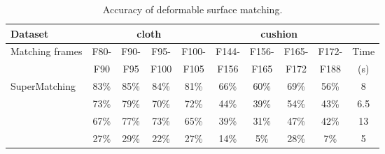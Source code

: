 \begin{table}[tb]
\centering
\tabcolsep=1pt
\setlength{\aboverulesep}{0pt}
\setlength{\belowrulesep}{0pt}
\caption{Accuracy of deformable surface matching.}
\hspace{-5ex}
\label{tab:errorrate1}
\small
\begin{tabular}{l|c c c c | c c c c | c}
\toprule
{Dataset}  & \multicolumn{4}{|c|}{ {cloth}} & \multicolumn{4}{c|}{ {cushion}} & \\
\hline
 {Matching frames} &  {F80-}	&  {F90-}	& {F95-}	& {F100-} & {F144-} & {F156-}	& {F165-}	& {F172-} &  {Time}  \\
 {}                &  {F90 }    &  {F95 }   & {F100}    & {F105}  & {F156}  & {F165}    & {F172}    & {F188}  &  {(s)} \\
\hline
 {SuperMatching}   &  {83\%}    &  {85\%}	& {84\%} 	& {81\%}  & {66\%}	& {60\%}	& {69\%}	& {56\%}  &  {8}  \\
 {\cite{Zass08}}   & {73\%}	    & {79\%}	& {70\%}	& {72\%}  & {44\%}  & {39\%}    & {54\%}	& {43\%}   & {6.5}  \\
{\cite{Duchenne09}} & {67\%}    & {77\%}    & {73\%}	& {65\%}  & {39\%}	& {31\%}	& {47\%}	& {42\%}   & {13}  \\
 {\cite{Cour06}}   & {27\%}     & {29\%}	&  {22\%}	& {27\%}  & {14\%}  & {5\%}	    & {28\%}	& {7\%}    & {5}  \\
\bottomrule
\end{tabular}%
\end{table}%
